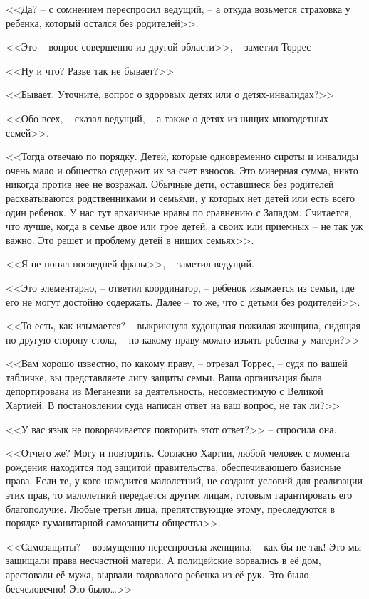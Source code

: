 <<Да? -- с сомнением переспросил ведущий, -- а откуда возьмется страховка у ребенка, который остался без родителей>>.

<<Это -- вопрос совершенно из другой области>>, -- заметил Торрес

<<Ну и что? Разве так не бывает?>>

<<Бывает. Уточните, вопрос о здоровых детях или о детях-инвалидах?>>

<<Обо всех, -- сказал ведущий, -- а также о детях из нищих многодетных семей>>.

<<Тогда отвечаю по порядку. Детей, которые одновременно сироты и инвалиды очень мало и общество содержит их за счет взносов. Это мизерная сумма, никто никогда против нее не возражал. Обычные дети, оставшиеся без родителей расхватываются родственниками и семьями, у которых нет детей или есть всего один ребенок. У нас тут архаичные нравы по сравнению с Западом. Считается, что лучше, когда в семье двое или трое детей, а своих или приемных -- не так уж важно. Это решет и проблему детей в нищих семьях>>.

<<Я не понял последней фразы>>, -- заметил ведущий.

<<Это элементарно, -- ответил координатор, -- ребенок изымается из семьи, где его не могут достойно содержать. Далее -- то же, что с детьми без родителей>>.

<<То есть, как изымается? -- выкрикнула худощавая пожилая женщина, сидящая по другую сторону стола, -- по какому праву можно изъять ребенка у матери?>>

<<Вам хорошо известно, по какому праву, -- отрезал Торрес, -- судя по вашей табличке, вы представляете лигу защиты семьи. Ваша организация была депортирована из Меганезии за деятельность, несовместимую с Великой Хартией. В постановлении суда написан ответ на ваш вопрос, не так ли?>>

<<У вас язык не поворачивается повторить этот ответ?>> -- спросила она.

<<Отчего же? Могу и повторить. Согласно Хартии, любой человек с момента рождения находится под защитой правительства, обеспечивающего базисные права. Если те, у кого находится малолетний, не создают условий для реализации этих прав, то малолетний передается другим лицам, готовым гарантировать его благополучие. Любые третьи лица, препятствующие этому, преследуются в порядке гуманитарной самозащиты общества>>.

<<Самозащиты? -- возмущенно переспросила женщина, -- как бы не так! Это мы защищали права несчастной матери. А полицейские ворвались в её дом, арестовали её мужа, вырвали годовалого ребенка из её рук. Это было бесчеловечно! Это было\ldots{}>>

